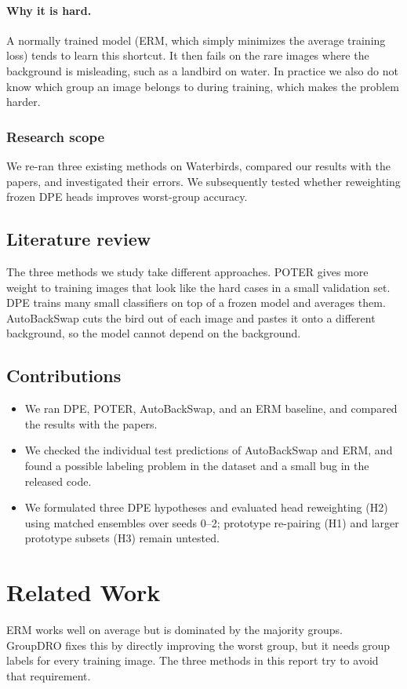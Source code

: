 \documentclass[runningheads]{llncs}
\begin{document}
\paragraph{Why it is hard.}
A normally trained model (ERM, which simply minimizes the average training loss) tends to learn this shortcut. It then fails on the rare images where the background is misleading, such as a landbird on water. In practice we also do not know which group an image belongs to during training, which makes the problem harder.

\subsubsection{Research scope}
We re-ran three existing methods on Waterbirds, compared our results with the papers, and investigated their errors. We subsequently tested whether reweighting frozen DPE heads improves worst-group accuracy.

\subsection{Literature review}
The three methods we study take different approaches. POTER \cite{poter} gives more weight to training images that look like the hard cases in a small validation set. DPE \cite{dpe} trains many small classifiers on top of a frozen model and averages them. AutoBackSwap \cite{autobackswap} cuts the bird out of each image and pastes it onto a different background, so the model cannot depend on the background.

\subsection{Contributions}
\begin{itemize}
    \item We ran DPE, POTER, AutoBackSwap, and an ERM baseline, and compared the results with the papers.
    \item We checked the individual test predictions of AutoBackSwap and ERM, and found a possible labeling problem in the dataset and a small bug in the released code.
    \item We formulated three DPE hypotheses and evaluated head reweighting (H2) using matched ensembles over seeds 0--2; prototype re-pairing (H1) and larger prototype subsets (H3) remain untested.
\end{itemize}

\section{Related Work}
ERM works well on average but is dominated by the majority groups. GroupDRO \cite{waterbirds} fixes this by directly improving the worst group, but it needs group labels for every training image. The three methods in this report try to avoid that requirement.
\end{document}
